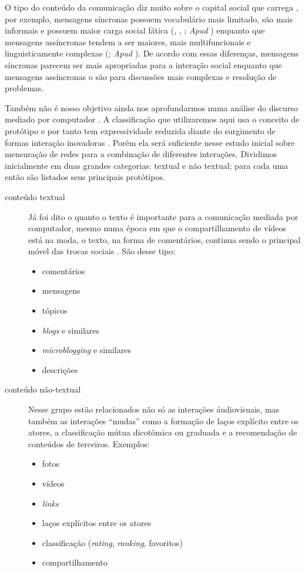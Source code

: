 \documentclass{article}
\begin{document}
O tipo do conteúdo da comunicação diz muito sobre o capital social que carrega
\cite{Kim2007}, por exemplo, mensagens síncronas possuem vocabulário mais
limitado, são mais informais e possuem maior carga social fática
(\cite{Danet1998}, \cite{Ko1996}, \cite{WERRY1996}; \textit{Apud}
\cite{Herring2002}) enquanto que mensagens assíncronas tendem a ser maiores,
mais multifuncionais e linguisticamente complexas (\cite{Herring1999};
\textit{Apud} \cite{Herring2002}). De acordo com essas diferenças, mensagens
síncronas parecem ser mais apropriadas para a interação social enquanto que
mensagens assíncronas o são para discussões mais complexas e resolução de
problemas.

Também não é nosso objetivo ainda nos aprofundarmos numa análise do discurso
mediado por computador \cite{Herring2001}. A classificação que utilizaremos 
aqui usa o conceito de protótipo e por tanto tem expressividade reduzida diante
do surgimento de formas interação inovadoras \cite{Herring2007}. Porém ela será
suficiente nesse estudo inicial sobre mensuração de redes para a combinação de
diferentes interações. Dividimos inicialmente em duas grandes categorias:
textual e não textual; para cada uma então são listados seus principais
protótipos.

\begin{description}
\item[conteúdo textual] Já foi dito o quanto o texto é importante para a
comunicação mediada por computador, mesmo numa época em que o compartilhamento
de vídeos está na moda, o texto, na forma de comentários, continua sendo o
principal móvel das trocas sociais \cite{Herring2002}. São desse tipo:
\begin{itemize}
  \item comentários
  \item mensagens
  \item tópicos
  \item \textit{blogs} e similares
  \item \textit{microblogging} e similares
  \item descrições
\end{itemize}
\item[conteúdo não-textual] Nesse grupo estão relacionados não só as interações
áudiovisuais, mas também as interações ``mudas'' como a formação de laços
explícito entre os atores, a classificação mútua dicotômica ou graduada e a
recomendação de conteúdos de terceiros. Exemplos:
\begin{itemize}
  \item fotos
  \item vídeos
  \item \textit{links}
  \item laços explícitos entre os atores
  \item classificação (\textit{rating}, \textit{ranking}, favoritos)
  \item compartilhamento
\end{itemize}
\end{description}
\end{document}
